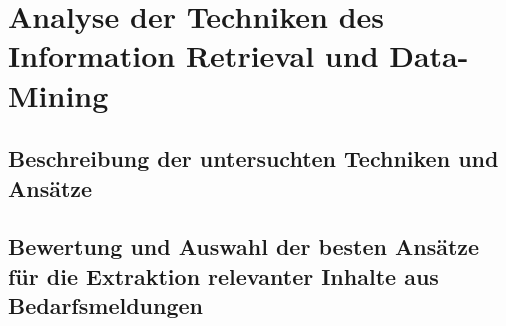 \chapter{Analyse der Techniken des Information Retrieval und Data-Mining}
\label{chap:staffingadvisor}

\section{Beschreibung der untersuchten Techniken und Ansätze}

\section{Bewertung und Auswahl der besten Ansätze für die Extraktion relevanter Inhalte aus Bedarfsmeldungen}

\newpage